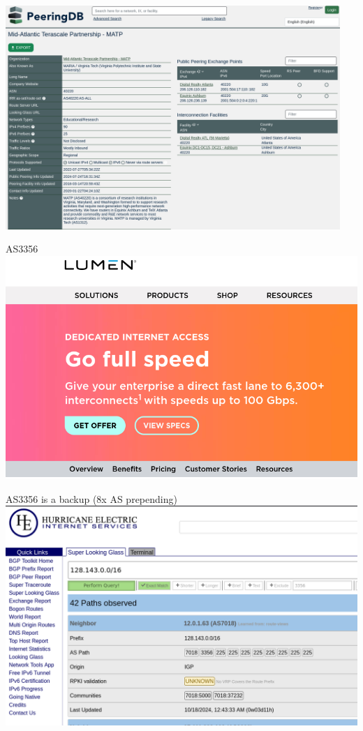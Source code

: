 \begin{frame}{}
\includegraphics[width=0.95\textwidth]{../routing/as40220-peeringdb}
\end{frame}

\begin{frame}{AS3356}
\includegraphics[height=0.8\textheight]{../routing/lumen-webpage.png}
\end{frame}

\begin{frame}{AS3356 is a backup (8x AS prepending)}
\includegraphics[height=0.8\textheight]{../routing/as3356-he-superlg.png}
\end{frame}
